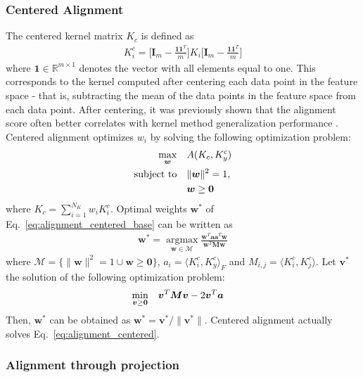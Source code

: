 \documentclass[reprint,amsfonts, amssymb, amsmath,  showkeys, nofootinbib,pra, superscriptaddress, twocolumn,longbibliography]{revtex4-2}
\begin{document}
\subsubsection{Centered Alignment}
The centered kernel matrix $K_c$ is defined as
\begin{align}
    K^c_i = \biggl[ \bm{I}_m - \frac{\bm{1}\bm{1}^T}{m} \biggr] K_i \biggl[ \bm{I}_m - \frac{\bm{1}\bm{1}^T}{m} \biggr]
\end{align}
where $\bm{1} \in \mathbb{R}^{m \times 1}$ denotes the vector with all elements equal to one. This corresponds to the kernel computed after centering each data point in the feature space - that is, subtracting the mean of the data points in the feature space from each data point.  After centering, it was previously shown that the alignment score often better correlates with kernel method  generalization performance \cite{JMLR:v13:cortes12a}. Centered alignment optimizes $w_i$ by solving the following optimization problem:
\begin{align}
    \max_{\bm{w}} \quad &\null A(K_c, K_y^c) \label{eq:alignment_centered_base} \\
    \text{subject to} \quad &\null \| \bm{w} \|^2 = 1, \nonumber \\
    &\null \bm{w} \ge \bm{0} \nonumber
\end{align}
where $K_c = \sum^{N_K}_{i=1} w_i K^c_i$. Optimal weights $\bm{w}^*$ of Eq.~\ref{eq:alignment_centered_base} can be written as
\begin{align}
    \bm{w}^* = \underset{\bm{w} \in \mathcal{M}} {\operatorname{argmax}} \frac{\bm{w}^T \bm{a} \bm{a}^T\bm{w}}{\bm{w}^T \bm{M} \bm{w}}
\end{align}
where $\mathcal{M} = \{ \| \bm{w} \|^2 = 1 \cup \bm{w} \ge \bm{0}\}$, $a_i = \langle K^c_i, K_y^c \rangle_F$ and $M_{i, j} = \langle K^c_i, K^c_j \rangle$. Let $\bm{v}^*$ the solution of the following optimization problem:
\begin{align}
    \min_{\bm{v} \ge \bm{0}} \quad &\null \bm{v}^T \bm{M} \bm{v} - 2 \bm{v}^T \bm{a} \label{eq:alignment_centered}
\end{align}
Then, $\bm{w}^*$ can be obtained as $\bm{w}^* = \bm{v}^*/ \| \bm{v}^* \|$. Centered alignment actually solves Eq.~\ref{eq:alignment_centered}.

\subsubsection{Alignment through projection}
\end{document}
